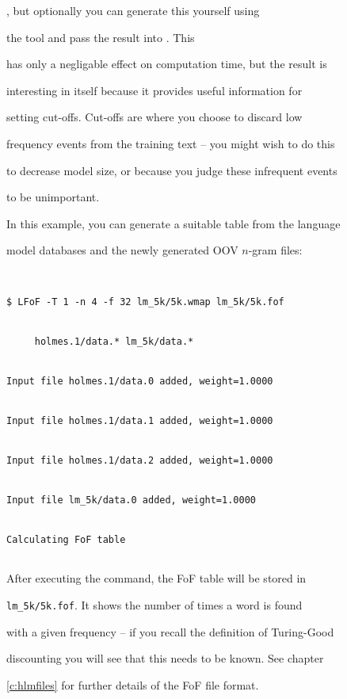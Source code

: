 , but optionally you can generate this yourself using


the  tool and pass the result into .  This


has only a negligable effect on computation time, but the result is


interesting in itself because it provides useful information for


setting cut-offs.  Cut-offs are where you choose to discard low


frequency events from the training text -- you might wish to do this


to decrease model size, or because you judge these infrequent events


to be unimportant.





In this example, you can generate a suitable table from the language


model databases and the newly generated OOV $n$-gram files:


\begin{verbatim}


$ LFoF -T 1 -n 4 -f 32 lm_5k/5k.wmap lm_5k/5k.fof


     holmes.1/data.* lm_5k/data.*


Input file holmes.1/data.0 added, weight=1.0000


Input file holmes.1/data.1 added, weight=1.0000


Input file holmes.1/data.2 added, weight=1.0000


Input file lm_5k/data.0 added, weight=1.0000


Calculating FoF table


\end{verbatim} %





After executing the command, the FoF table will be stored in


\texttt{lm\_5k/5k.fof}.  It shows the number of times a word is found


with a given frequency -- if you recall the definition of Turing-Good


discounting you will see that this needs to be known.  See chapter


\ref{c:hlmfiles} for further details of the FoF file format.





